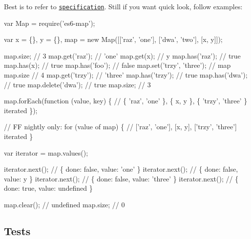 Best is to refer to \href{http://people.mozilla.org/~jorendorff/es6-draft.html#sec-map-objects}{\tt specification}. Still if you want quick look, follow examples\+:


\begin{DoxyCode}
var Map = require('es6-map');

var x = \{\}, y = \{\}, map = new Map([['raz', 'one'], ['dwa', 'two'], [x, y]]);

map.size;                 // 3
map.get('raz');           // 'one'
map.get(x);               // y
map.has('raz');           // true
map.has(x);               // true
map.has('foo');           // false
map.set('trzy', 'three'); // map
map.size                  // 4
map.get('trzy');          // 'three'
map.has('trzy');          // true
map.has('dwa');           // true
map.delete('dwa');        // true
map.size;                 // 3

map.forEach(function (value, key) \{
  // \{ 'raz', 'one' \}, \{ x, y \}, \{ 'trzy', 'three' \} iterated
\});

// FF nightly only:
for (value of map) \{
 // ['raz', 'one'], [x, y], ['trzy', 'three'] iterated
\}

var iterator = map.values();

iterator.next(); // \{ done: false, value: 'one' \}
iterator.next(); // \{ done: false, value: y \}
iterator.next(); // \{ done: false, value: 'three' \}
iterator.next(); // \{ done: true, value: undefined \}

map.clear(); // undefined
map.size; // 0
\end{DoxyCode}


\subsection*{Tests \href{https://travis-ci.org/medikoo/es6-map}{\tt }}

 